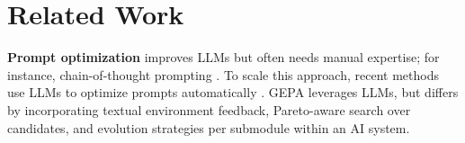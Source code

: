\documentclass{article} %
\begin{document}



\section{Related Work}
\vspace{-2mm}
\textbf{Prompt optimization} improves LLMs but often needs manual expertise; for instance, chain-of-thought prompting \cite{wei2023chainofthoughtpromptingelicitsreasoning}. To scale this approach, recent methods use LLMs to optimize prompts automatically \citep{zhou2022large, yang2024largelanguagemodelsoptimizers, agarwal2024promptwizardtaskawarepromptoptimization, 10.5555/3692070.3692611}. GEPA leverages LLMs, but differs by incorporating textual environment feedback, Pareto-aware search over candidates, and evolution strategies per submodule within an AI system.
\end{document}
